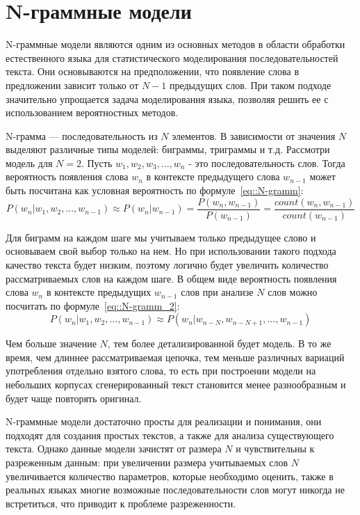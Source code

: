 \section{N-граммные модели}
N-граммные модели являются одним из основных методов в области обработки естественного языка для статистического моделирования последовательностей текста. Они основываются на предположении, что появление слова в предложении зависит только от $N - 1$ предыдущих слов. При таком подходе значительно упрощается задача моделирования языка, позволяя решить ее с использованием вероятностных методов.

N-грамма --- последовательность из $N$ элементов. В зависимости от значения $N$ выделяют различные типы моделей: биграммы, триграммы и т.д. Рассмотри модель для $N = 2$. Пусть $w_1, w_2, w_3, ..., w_n$ - это последовательность слов. Тогда вероятность появления слова $w_n$ в контексте предыдущего слова $w_{n-1}$ может быть посчитана как условная вероятность по формуле~\ref{eq::N-gramm}:
\begin{equation}
    \label{eq::N-gramm}
    P(w_n | w_1, w_2, ..., w_{n-1}) \approx P(w_n | w_{n-1}) = \frac{P(w_n, w_{n-1})}{P(w_{n-1})} = \frac{count(w_n, w_{n-1})}{count(w_{n-1})}
\end{equation}

Для биграмм на каждом шаге мы учитываем только предыдущее слово и основываем свой выбор только на нем. Но при использовании такого подхода качество текста будет низким, поэтому логично будет увеличить количество рассматриваемых слов на каждом шаге. В общем виде вероятность появления слова $w_n$ в контексте предыдущих $w_{n-1}$ слов при анализе $N$ слов можно посчитать по формуле~\ref{eq::N-gramm_2}:
\begin{equation}
    \label{eq::N-gramm_2}
    P(w_n | w_1, w_2, ..., w_{n-1}) \approx P(w_n | w_{n - N}, w_{n-N+1}, ..., w_{n-1})
\end{equation}

Чем больше значение $N$, тем более детализированной будет модель. В то же время, чем длиннее рассматриваемая цепочка, тем меньше различных вариаций употребления отдельно взятого слова, то есть при построении модели на небольших корпусах сгенерированный текст становится менее разнообразным и будет чаще повторять оригинал.

N-граммные модели достаточно просты для реализации и понимания, они подходят для создания простых текстов, а также для анализа существующего текста. Однако данные модели зачистят от размера $N$ и чувствительны к разреженным данным: при увеличении размера учитываемых слов $N$ увеличивается количество параметров, которые необходимо оценить, также в реальных языках многие возможные последовательности слов могут никогда не встретиться, что приводит к проблеме разреженности. 

